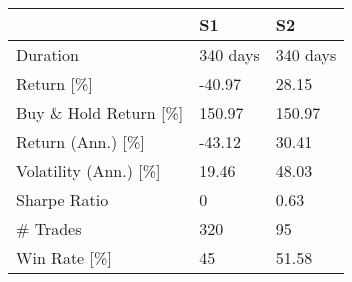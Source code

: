 \begin{tabular}{lll}
\toprule
 & S1 & S2 \\
\midrule
Duration & 340 days   & 340 days   \\
Return  [\%] & -40.97 & 28.15 \\
Buy \& Hold Return  [\%] & 150.97 & 150.97 \\
Return (Ann.)  [\%] & -43.12 & 30.41 \\
Volatility (Ann.)  [\%] & 19.46 & 48.03 \\
Sharpe Ratio & 0  & 0.63 \\
\# Trades & 320 & 95 \\
Win Rate  [\%] & 45  & 51.58 \\
\bottomrule
\end{tabular}
